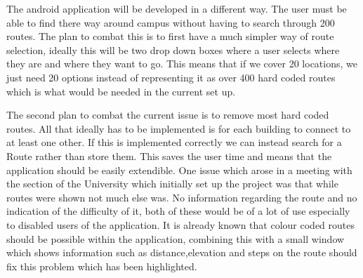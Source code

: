 The android application will be developed in a different way. The user must be able to find there way around campus without having to search through 200 routes. The plan to combat this is to first have a much simpler way of route selection, ideally this will be two drop down boxes where a user selects where they are and where they want to go. This means that if we cover 20 locations, we just need 20 options instead of representing it as over 400 hard coded routes which is what would be needed in the current set up. 

The second plan to combat the current issue is to remove most hard coded routes. All that ideally has to be implemented is for each building to connect to at least one other. If this is implemented correctly we can instead search for a Route rather than store them. This saves the user time and means that the application should be easily extendible. 
One issue which arose in a meeting with the section of the University which initially set up the project was that while routes were shown not much else was. No information regarding the route and no indication of the difficulty of it, both of these would be of a lot of use especially to disabled users of the application. It is already known that colour coded routes should be possible within the application, combining this with a small window which shows information such as distance,elevation and steps on the route should fix this problem which has been highlighted. 

